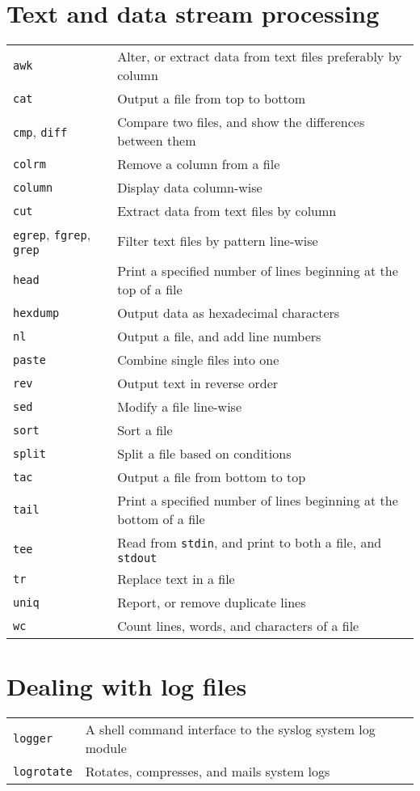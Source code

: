 \documentclass[10pt]{article}
\begin{document}
\begin{multicols}{2}
\section{Text and data stream processing}
\begin{tabular}{ p{2.5cm} p{8.5cm} }
  \hline
  \texttt{awk} & Alter, or extract data from text files preferably by column\\
  \texttt{cat} & Output a file from top to bottom \\
  \texttt{cmp}, \texttt{diff} & Compare two files, and show the differences between them\\
  \texttt{colrm} & Remove a column from a file \\
  \texttt{column} & Display data column-wise \\
  \texttt{cut} & Extract data from text files by column \\
  \texttt{egrep}, \texttt{fgrep}, \texttt{grep} & Filter text files by pattern line-wise \\
  \texttt{head} & Print a specified number of lines beginning at  the top of a file\\
  \texttt{hexdump} & Output data as hexadecimal characters\\
  \texttt{nl} & Output a file, and add line numbers\\
  \texttt{paste} & Combine single files into one \\
  \texttt{rev} & Output text in reverse order \\
  \texttt{sed} & Modify a file line-wise \\
  \texttt{sort} & Sort a file \\
  \texttt{split} & Split a file based on conditions\\
  \texttt{tac} & Output a file from bottom to top\\
  \texttt{tail} & Print a specified number of lines beginning at the bottom of a file\\
  \texttt{tee} & Read from \texttt{stdin}, and print to both a file, and \texttt{stdout}\\
  \texttt{tr} & Replace text in a file\\
  \texttt{uniq} & Report, or remove duplicate lines \\
  \texttt{wc} & Count lines, words, and characters of a file\\
  \hline
\end{tabular}

\hfill

\section{Dealing with log files}
\begin{tabular}{ p{2.5cm} p{8.5cm} }
  \hline
  \texttt{logger} & A shell command interface to the syslog system log module \\
  \texttt{logrotate} & Rotates, compresses, and mails system logs \\
  \hline
\end{tabular}

\end{multicols}
\end{document}
